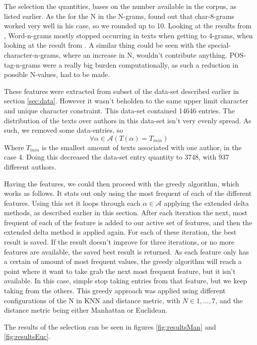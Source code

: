 The selection the quantities, bases on the number available in the corpus, as
listed earlier. As the for the N in the N-grams, \cite{aalykke2016} found out
that char-8-grams worked very well in his case, so we rounded up to 10. Looking
at the results from \cite{US}, Word-n-grams mostly stopped occurring in texts
when getting to 4-grams, when looking at the result from \cite{US}. A similar
thing could be seen with the special-character-n-grams, where an increase in N,
wouldn't contribute anything. \gls{POS}-tag-n-grams were a really big burden
computationally, as such a reduction in possible N-values, had to be made.

These features were extracted from subset of the data-set described earlier
in section \ref{sec:data}. However it wasn't beholden to the same upper limit
character and unique character constraint. This data-set contained 14646
entries. The distribution of the texts over authors in this data-set isn't
very evenly spread. As such, we removed some data-entries, so $$\forall \alpha
\in \mathcal{A} (T(\alpha) = T_{min})$$ Where $T_{min}$ is the smallest amount
of texts associated with one author, in the case 4. Doing this decreased the
data-set entry quantity to 3748, with 937 different authors.

Having the features, we could then proceed with the greedy algorithm, which
works as follows. It stats out only using the most frequent of each of
the different features. Using this set it loops through each $\alpha \in
\mathcal{A}$ applying the extended delta methods, as described earlier in this
section. After each iteration the next, most frequent of each of the feature
is added to our active set of features, and then the extended delta method is
applied again. For each of these iteration, the best result is saved. If the
result doesn't improve for three iterations, or no more features are available,
the saved best result is returned. As each feature only has a certain of amount
of most frequent values, the greedy algorithm will reach a point where it want
to take grab the next most frequent feature, but it isn't available. In this
case, simple stop taking entries from that feature, but we keep taking from the
others. This greedy approach was applied using different configurations of the
N in KNN and distance metric, with $N \in {1,...,7}$, and the distance metric
being either Manhattan or Euclidean.

The results of the selection can be seen in figures \ref{fig:resultsMan} and 
\ref{fig:resultsEuc}. 

